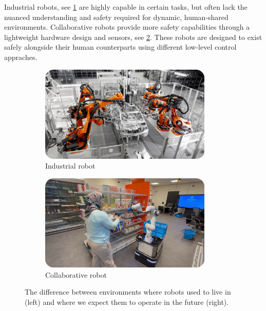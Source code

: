 Industrial robots, see \cref{fig:industrial_robot}
are highly capable in certain tasks, but
often lack the nuanced understanding and safety required for
dynamic, human-shared environments. Collaborative robots
provide more safety capabilities through a lightweight
hardware design and sensors, see
\cref{fig:collaborative_robot}. These
robots are designed to exist safely alongside their human
counterparts using different low-level control appraches.

\begin{figure}
  \centering
  \begin{subfigure}{0.5\textwidth}
    \centering
    \includegraphics[width=0.9\textwidth]{src/introduction/img/industrial_robot.png}
    \caption{Industrial robot}
    \label{fig:industrial_robot}
  \end{subfigure}%
  \begin{subfigure}{0.5\textwidth}
    \centering
    \includegraphics[width=0.9\textwidth]{src/introduction/img/collaborative_robot.png}
    \caption{Collaborative robot}
    \label{fig:collaborative_robot}
  \end{subfigure}
  \caption{The difference between environments where robots
  used to live in (left) and where we expect them to operate
  in the future (right).}
  \label{fig:different_robots}
\end{figure}


